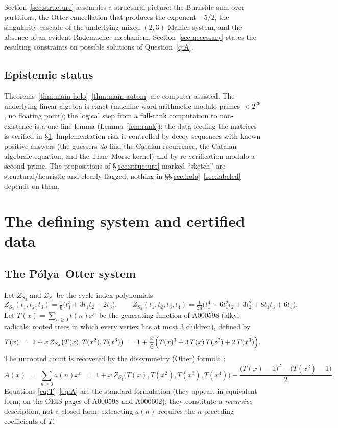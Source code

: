 \documentclass[11pt]{article}
\theoremstyle{definition}
\newcommand{\seqA}{\textnormal{A000602}}
\newcommand{\seqT}{\textnormal{A000598}}
\begin{document}
Section~\ref{sec:structure} assembles a structural picture: the Burnside sum
over partitions, the Otter cancellation that produces the exponent $-5/2$, the
singularity cascade of the underlying mixed $(2,3)$-Mahler system, and the
absence of an evident Rademacher mechanism. Section~\ref{sec:necessary} states
the resulting constraints on possible solutions of Question~\ref{q:A}.

\subsection*{Epistemic status}
Theorems~\ref{thm:main-holo}--\ref{thm:main-autom} are computer-assisted. The
underlying linear algebra is exact (machine-word arithmetic modulo primes
$<2^{26}$, no floating point); the logical step from a full-rank computation to
non-existence is a one-line lemma (Lemma~\ref{lem:rank}); the data feeding the
matrices is verified in \S\ref{sec:data}. Implementation risk is controlled by
decoy sequences with known positive answers (the guessers \emph{do} find the
Catalan recurrence, the Catalan algebraic equation, and the Thue--Morse kernel)
and by re-verification modulo a second prime. The propositions of
\S\ref{sec:structure} marked ``sketch'' are structural/heuristic and clearly
flagged; nothing in \S\S\ref{sec:holo}--\ref{sec:labeled} depends on them.

\section{The defining system and certified data}\label{sec:data}

\subsection{The P\'olya--Otter system}

Let $Z_{S_3}$ and $Z_{S_4}$ be the cycle index polynomials
\[
Z_{S_3}(t_1,t_2,t_3)=\tfrac{1}{6}\bigl(t_1^3+3t_1t_2+2t_3\bigr),
\qquad
Z_{S_4}(t_1,t_2,t_3,t_4)=\tfrac{1}{24}\bigl(t_1^4+6t_1^2t_2+3t_2^2+8t_1t_3+6t_4\bigr).
\]
Let $T(x)=\sum_{n\ge0}t(n)x^n$ be the generating function of \seqT{} (alkyl
radicals: rooted trees in which every vertex has at most $3$ children), defined
by
\begin{equation}\label{eq:T}
T(x)\;=\;1+x\,Z_{S_3}\bigl(T(x),T(x^2),T(x^3)\bigr)
\;=\;1+\frac{x}{6}\Bigl(T(x)^3+3\,T(x)\,T(x^2)+2\,T(x^3)\Bigr).
\end{equation}
The unrooted count is recovered by the dissymmetry (Otter) formula
\cite{Otter1948,HararyNorman1960,RainsSloane1999}:
\begin{equation}\label{eq:A}
A(x)\;=\;\sum_{n\ge0}a(n)x^n
\;=\;1+x\,Z_{S_4}\bigl(T(x),T(x^2),T(x^3),T(x^4)\bigr)
-\frac{\bigl(T(x)-1\bigr)^2-\bigl(T(x^2)-1\bigr)}{2}.
\end{equation}
Equations \eqref{eq:T}--\eqref{eq:A} are the standard formulation (they appear,
in equivalent form, on the OEIS pages of \seqT{} and \seqA{}); they constitute a
\emph{recursive} description, not a closed form: extracting $a(n)$ requires the
$n$ preceding coefficients of $T$.
\end{document}
